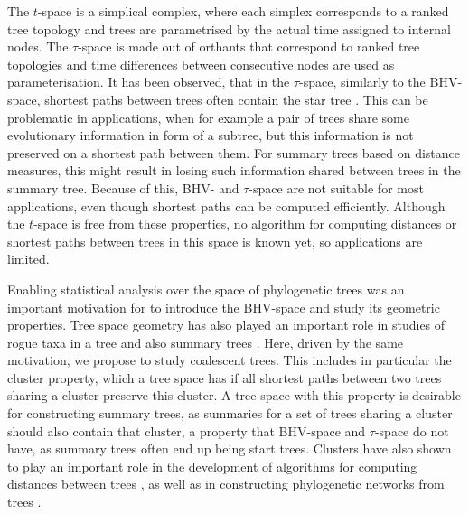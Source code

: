 \documentclass[11pt]{amsart}
\newcommand{\rnni}{\mathrm{RNNI}}
\newcommand{\dct}{\mathrm{DCT}}
\newcommand{\summary}[1]{} %
\begin{document}
The $t$-space is a simplical complex, where each simplex corresponds to a ranked tree topology and trees are parametrised by the actual time assigned to internal nodes.
The $\tau$-space is made out of orthants that correspond to ranked tree topologies and time differences between consecutive nodes are used as parameterisation.
It has been observed, that in the $\tau$-space, similarly to the BHV-space, shortest paths between trees often contain the star tree \autocite{Gavryushkin2016-uu}.
This can be problematic in applications, when for example a pair of trees share some evolutionary information in form of a subtree, but this information is not preserved on a shortest path between them.
For summary trees based on distance measures, this might result in losing such information shared between trees in the summary tree.
Because of this, BHV- and $\tau$-space are not suitable for most applications, even though shortest paths can be computed efficiently.
Although the $t$-space is free from these properties, no algorithm for computing distances or shortest paths between trees in this space is known yet, so applications are limited.

\summary{Why we want to investigate geometrical properties of $\dct_m$ and $\rnni$}
Enabling statistical analysis over the space of phylogenetic trees was an important motivation for \textcite{Billera2001-rj} to introduce the BHV-space and study its geometric properties.
Tree space geometry has also played an important role in studies of rogue taxa in a tree \autocite{Cueto2011-bh} and also summary trees \autocite{Miller2015-rk}.
Here, driven by the same motivation, we propose to study coalescent trees.
This includes in particular the cluster property, which a tree space has if all shortest paths between two trees sharing a cluster preserve this cluster.
A tree space with this property is desirable for constructing summary trees, as summaries for a set of trees sharing a cluster should also contain that cluster, a property that BHV-space and $\tau$-space do not have, as summary trees often end up being start trees.
Clusters have also shown to play an important role in the development of algorithms for computing distances between trees \autocite{Bordewich2005-nx}, as well as in constructing phylogenetic networks from trees \autocite{Baroni2006-cv}.
\end{document}
